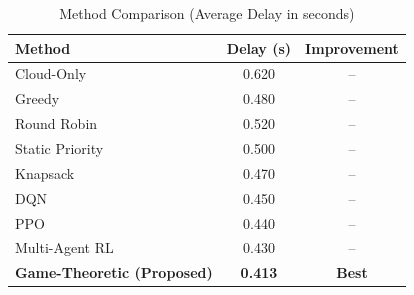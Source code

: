 \begin{table}[htb]
\centering
\caption{Method Comparison (Average Delay in seconds)}
\label{tab:comparison}
\begin{tabular}{lcc}
\toprule
\textbf{Method} & \textbf{Delay (s)} & \textbf{Improvement} \\
\midrule
Cloud-Only & 0.620 & -- \\
Greedy & 0.480 & -- \\
Round Robin & 0.520 & -- \\
Static Priority & 0.500 & -- \\
Knapsack & 0.470 & -- \\
DQN & 0.450 & -- \\
PPO & 0.440 & -- \\
Multi-Agent RL & 0.430 & -- \\
\midrule
\textbf{Game-Theoretic (Proposed)} & \textbf{0.413} & \textbf{Best} \\
\bottomrule
\end{tabular}
\end{table}
